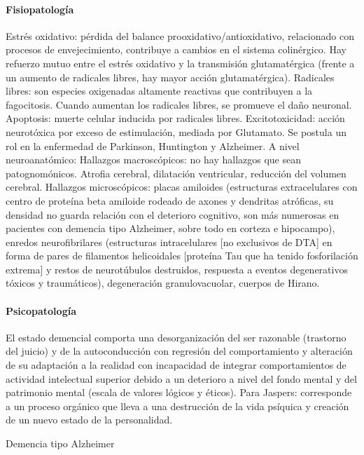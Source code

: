 \paragraph{Fisiopatología}
Estrés oxidativo: pérdida del balance prooxidativo/antioxidativo, relacionado con procesos de envejecimiento, contribuye a cambios en el sistema colinérgico. Hay refuerzo mutuo entre el estrés oxidativo y la transmisión glutamatérgica (frente a un aumento de radicales libres, hay mayor acción glutamatérgica). Radicales libres: son especies oxigenadas altamente reactivas que contribuyen a la fagocitosis. Cuando aumentan los radicales libres, se promueve el daño neuronal. Apoptosis: muerte celular inducida por radicales libres. Excitotoxicidad: acción neurotóxica por exceso de estimulación, mediada por Glutamato. Se postula un rol en la enfermedad de Parkinson, Huntington y Alzheimer. A nivel neuroanatómico: Hallazgos macroscópicos: no hay hallazgos que sean patognomónicos. Atrofia cerebral, dilatación ventricular, reducción del volumen cerebral. Hallazgos microscópicos: placas amiloides (estructuras extracelulares con centro de proteína beta amiloide rodeado de axones y dendritas atróficas, su densidad no guarda relación con el deterioro cognitivo, son más numerosas en pacientes con demencia tipo Alzheimer, sobre todo en corteza e hipocampo), enredos neurofibrilares (estructuras intracelulares [no exclusivos de DTA] en forma de pares de filamentos helicoidales [proteína Tau que ha tenido fosforilación extrema] y restos de neurotúbulos destruidos, respuesta a eventos degenerativos tóxicos y traumáticos), degeneración granulovacuolar, cuerpos de Hirano.

\paragraph{Psicopatología}
El estado demencial comporta una desorganización del ser razonable (trastorno del juicio) y de la autoconducción con regresión del comportamiento y alteración de su adaptación a la realidad con incapacidad de integrar comportamientos de actividad intelectual superior debido a un deterioro a nivel del fondo mental y del patrimonio mental (escala de valores lógicos y éticos). Para Jaspers: corresponde a un proceso orgánico que lleva a una destrucción de la vida psíquica y creación de un nuevo estado de la personalidad.

Demencia tipo Alzheimer

